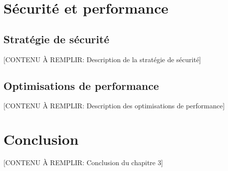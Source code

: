 \section{Sécurité et performance}


\subsection{Stratégie de sécurité}

[CONTENU À REMPLIR: Description de la stratégie de sécurité]


\subsection{Optimisations de performance}

[CONTENU À REMPLIR: Description des optimisations de performance]

\section*{Conclusion}


[CONTENU À REMPLIR: Conclusion du chapitre 3]
